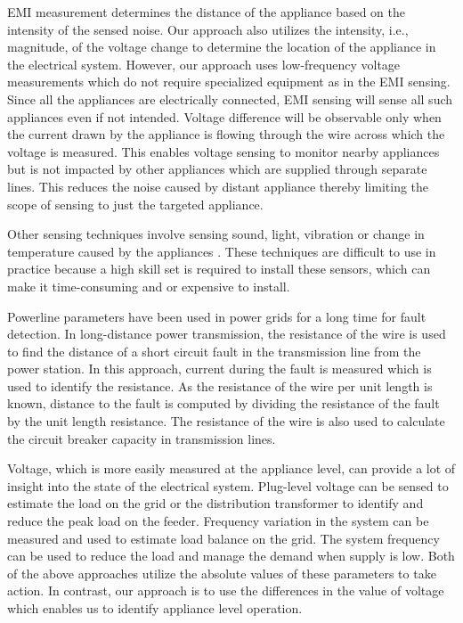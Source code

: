 EMI measurement determines the distance of the appliance based on the intensity of the sensed noise. Our approach also utilizes the intensity, i.e., magnitude, of the voltage change to determine the location of the appliance in the electrical system. However, our approach uses low-frequency voltage measurements which do not require specialized equipment as in the EMI sensing. Since all the appliances are electrically connected, EMI sensing will sense all such appliances even if not intended.
Voltage difference will be observable only when the current drawn by the appliance is flowing through the wire across which the voltage is measured. This enables voltage sensing to monitor nearby appliances but is not impacted by other appliances which are supplied through separate lines. This reduces the noise caused by distant appliance thereby limiting the scope of sensing to just the targeted appliance.

Other sensing techniques involve sensing sound, light, vibration or change in temperature caused by the appliances \cite{hnatHitchhikerGuideSuccessful2011}. These techniques are difficult to use in practice because a high skill set is required to install these sensors, which can make it time-consuming and or expensive to install.

Powerline parameters have been used in power grids for a long time for fault detection. In long-distance power transmission, the resistance of the wire is used to find the distance of a short circuit fault in the transmission line from the power station.
In this approach, current during the fault is measured which is used to identify the resistance.
As the resistance of the wire per unit length is known, distance to the fault is computed by dividing the resistance of the fault by the unit length resistance.
The resistance of the wire is also used to calculate the circuit breaker capacity in transmission lines.

Voltage, which is more easily measured at the appliance level, can provide a lot of insight into the state of the electrical system.
Plug-level voltage can be sensed to estimate the load on the grid or the distribution transformer \cite{ganuNPlugSmartPlug2012} to identify and reduce the peak load on the feeder.
Frequency variation in the system can be measured and used to estimate load balance on the grid. The system frequency can be used to reduce the load \cite{haoAncillaryServiceGrid2014} and manage the demand when supply is low.
Both of the above approaches utilize the absolute values of these parameters to take action. In contrast, our approach is to use the differences in the value of voltage which enables us to identify appliance level operation.

